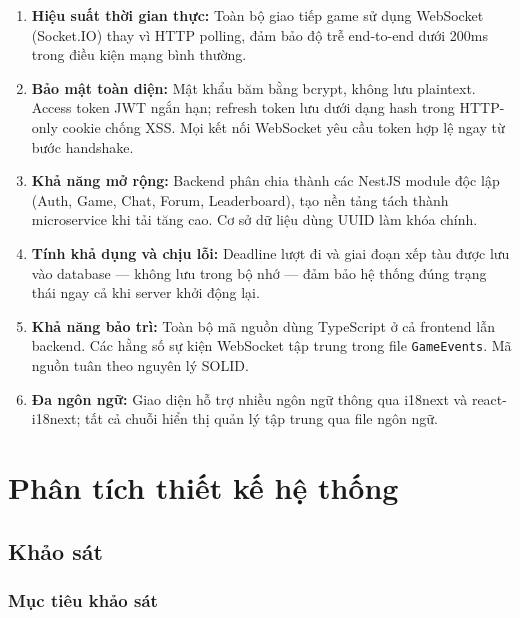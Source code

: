 \documentclass[13pt, a4paper]{extreport}
\begin{document}
\begin{enumerate}[label=\alph*.]
  \item \textbf{Hiệu suất thời gian thực:} Toàn bộ giao tiếp game sử dụng WebSocket (Socket.IO)
    thay vì HTTP polling, đảm bảo độ trễ end-to-end dưới 200ms trong điều kiện mạng bình thường.

  \item \textbf{Bảo mật toàn diện:} Mật khẩu băm bằng bcrypt, không lưu plaintext. Access token
    JWT ngắn hạn; refresh token lưu dưới dạng hash trong HTTP-only cookie chống XSS. Mọi kết nối
    WebSocket yêu cầu token hợp lệ ngay từ bước handshake.

  \item \textbf{Khả năng mở rộng:} Backend phân chia thành các NestJS module độc lập (Auth, Game,
    Chat, Forum, Leaderboard), tạo nền tảng tách thành microservice khi tải tăng cao. Cơ sở dữ
    liệu dùng UUID làm khóa chính.

  \item \textbf{Tính khả dụng và chịu lỗi:} Deadline lượt đi và giai đoạn xếp tàu được lưu vào
    database — không lưu trong bộ nhớ — đảm bảo hệ thống đúng trạng thái ngay cả khi server khởi
    động lại.

  \item \textbf{Khả năng bảo trì:} Toàn bộ mã nguồn dùng TypeScript ở cả frontend lẫn backend.
    Các hằng số sự kiện WebSocket tập trung trong file \texttt{GameEvents}. Mã nguồn tuân theo
    nguyên lý SOLID.

  \item \textbf{Đa ngôn ngữ:} Giao diện hỗ trợ nhiều ngôn ngữ thông qua i18next và
    react-i18next; tất cả chuỗi hiển thị quản lý tập trung qua file ngôn ngữ.
\end{enumerate}

\chapter{Phân tích thiết kế hệ thống}

\section{Khảo sát}

\subsection{Mục tiêu khảo sát}
\end{document}
